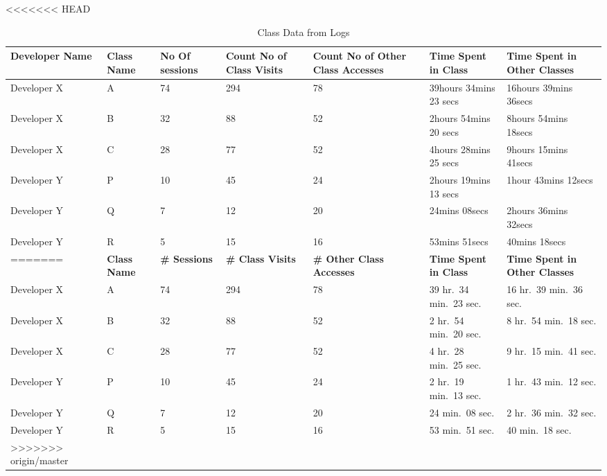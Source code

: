 \begin{table*}[!t]
    \renewcommand{\arraystretch}{1.3}
	\centering
	\caption{Class Data from Logs}
<<<<<<< HEAD
	\begin{tabular}{|l|l|l|l|l|l|l|}
	\hline

Developer Name & Class Name & No Of sessions &Count No of Class Visits & Count No of Other Class Accesses & Time Spent in Class & Time Spent in Other Classes\\
\hline\hline
Developer X & A & 74 & 294 & 78 & 39hours 34mins 23 secs & 16hours 39mins 36secs\\
\hline
Developer X & B & 32 & 88 & 52 & 2hours 54mins 20 secs & 8hours 54mins 18secs\\
\hline
Developer X & C & 28 & 77 & 52 & 4hours 28mins 25 secs & 9hours 15mins 41secs\\
\hline
Developer Y & P & 10 & 45 & 24 & 2hours 19mins 13 secs & 1hour 43mins 12secs\\
\hline
Developer Y & Q & 7 & 12 & 20 & 24mins 08secs & 2hours 36mins 32secs\\
\hline
Developer Y & R & 5 & 15 & 16 & 53mins 51secs & 40mins 18secs\\
\hline

=======
	\begin{tabular}{llrrrrr}
	\toprule
\textbf{Developer Name} & \textbf{Class Name} & \textbf{\# Sessions} & \textbf{\# Class Visits} & \textbf{\# Other Class Accesses} & \textbf{Time Spent in Class} & \textbf{Time Spent in Other Classes}\\
\midrule
Developer X & A & 74 & 294 & 78 & 39 hr.\ 34 min.\ 23 sec. & 16 hr.\ 39 min.\ 36 sec.\\
Developer X & B & 32 & 88 & 52 & 2 hr.\ 54 min.\ 20 sec. & 8 hr.\ 54 min.\ 18 sec.\\
Developer X & C & 28 & 77 & 52 & 4 hr.\ 28 min.\ 25 sec. & 9 hr.\ 15 min.\ 41 sec.\\
Developer Y & P & 10 & 45 & 24 & 2 hr.\ 19 min.\ 13 sec. & 1 hr.\ 43 min.\ 12 sec.\\
Developer Y & Q & 7 & 12 & 20 & 24 min.\ 08 sec. & 2 hr.\ 36 min.\ 32 sec.\\
Developer Y & R & 5 & 15 & 16 & 53 min.\ 51 sec. & 40 min.\ 18 sec.\\
\bottomrule
>>>>>>> origin/master
	\end{tabular}
	\label{fig:ClassAnalysisData}
\end{table*}

